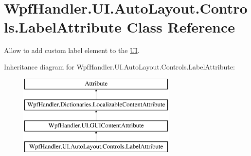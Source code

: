 \hypertarget{class_wpf_handler_1_1_u_i_1_1_auto_layout_1_1_controls_1_1_label_attribute}{}\section{Wpf\+Handler.\+U\+I.\+Auto\+Layout.\+Controls.\+Label\+Attribute Class Reference}
\label{class_wpf_handler_1_1_u_i_1_1_auto_layout_1_1_controls_1_1_label_attribute}


Allow to add custom label element to the \mbox{\hyperlink{namespace_wpf_handler_1_1_u_i}{UI}}.  


Inheritance diagram for Wpf\+Handler.\+U\+I.\+Auto\+Layout.\+Controls.\+Label\+Attribute\+:\begin{figure}[H]
\begin{center}
\leavevmode
\includegraphics[height=4.000000cm]{d9/d7c/class_wpf_handler_1_1_u_i_1_1_auto_layout_1_1_controls_1_1_label_attribute}
\end{center}
\end{figure}
